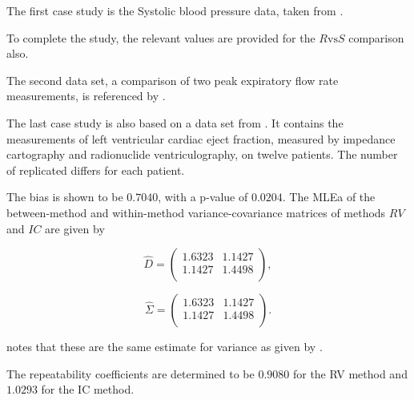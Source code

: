 
The first case study is the Systolic blood pressure data, taken from \citet{BA99}.



To complete the study, the relevant values are provided for the $R \mbox{vs} S$ comparison also.


The second data set, a comparison of two peak expiratory flow rate measurements, is referenced by \citet{BA86}.


The last case study is also based on a data set from  \citet{BA99}. It contains the measurements of left ventricular cardiac eject fraction, measured by impedance cartography and radionuclide ventriculography, on twelve patients.
The number of replicated differs for each patient.

The bias is shown to be $0.7040$, with a p-value of $0.0204$. The MLEa of the between-method and within-method variance-covariance matrices of methods $RV$ and $IC$ are given by

\begin{equation}\hat{D}=\left(
\begin{array}{cc}
1.6323 & 1.1427 \\
1.1427 & 1.4498 \\
\end{array}
\right),
\end{equation}



\begin{equation}\hat{\Sigma}=\left(
\begin{array}{cc}
1.6323 & 1.1427 \\
1.1427 & 1.4498 \\
\end{array}
\right).
\end{equation}

\citet{roy} notes that these are the same estimate for variance as given by \citet{BA99}.


The repeatability coefficients are determined to be $0.9080$ for the RV method and $1.0293$ for the IC method.

